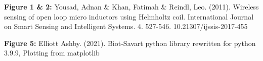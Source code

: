 \documentclass{article}
\begin{document}
   \begin{theindex}
       \item \textbf{Figure 1 \& 2:}
       \subitem Yousad, Adnan \& Khan, Fatimah \& Reindl, Leo. (2011). Wireless sensing of open loop micro inductors using Helmholtz coil. International Journal on Smart Sensing and Intelligent Systems. 4. 527-546. 10.21307/ijssis-2017-455
        \item \textbf{Figure 5:}
        \subitem Elliott Ashby. (2021). Biot-Savart python library rewritten for python 3.9.9, Plotting from matplotlib
    \end{theindex}
\end{document}
